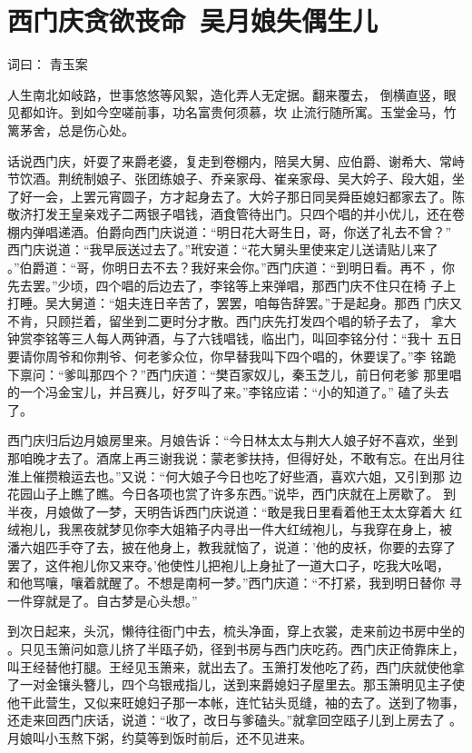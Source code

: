 \chapter{西门庆贪欲丧命~吴月娘失偶生儿}

词曰：
青玉案

人生南北如岐路，世事悠悠等风絮，造化弄人无定据。翻来覆去，
倒横直竖，眼见都如许。到如今空嗟前事，功名富贵何须慕，坎
止流行随所寓。玉堂金马，竹篱茅舍，总是伤心处。

话说西门庆，奸耍了来爵老婆，复走到卷棚内，陪吴大舅、应伯爵、谢希大、常峙
节饮酒。荆统制娘子、张团练娘子、乔亲家母、崔亲家母、吴大妗子、段大姐，坐
了好一会，上罢元宵圆子，方才起身去了。大妗子那日同吴舜臣媳妇都家去了。陈
敬济打发王皇亲戏子二两银子唱钱，酒食管待出门。只四个唱的并小优儿，还在卷
棚内弹唱递酒。伯爵向西门庆说道：“明日花大哥生日，哥，你送了礼去不曾？”
西门庆说道：“我早辰送过去了。”玳安道：“花大舅头里使来定儿送请贴儿来了
。”伯爵道：“哥，你明日去不去？我好来会你。”西门庆道：“到明日看。再不
，你先去罢。”少顷，四个唱的后边去了，李铭等上来弹唱，那西门庆不住只在椅
子上打睡。吴大舅道：“姐夫连日辛苦了，罢罢，咱每告辞罢。”于是起身。那西
门庆又不肯，只顾拦着，留坐到二更时分才散。西门庆先打发四个唱的轿子去了，
拿大钟赏李铭等三人每人两钟酒，与了六钱唱钱，临出门，叫回李铭分付：“我十
五日要请你周爷和你荆爷、何老爹众位，你早替我叫下四个唱的，休要误了。”李
铭跪下禀问：“爹叫那四个？”西门庆道：“樊百家奴儿，秦玉芝儿，前日何老爹
那里唱的一个冯金宝儿，并吕赛儿，好歹叫了来。”李铭应诺：“小的知道了。”
磕了头去了。

西门庆归后边月娘房里来。月娘告诉：“今日林太太与荆大人娘子好不喜欢，坐到
那咱晚才去了。酒席上再三谢我说：蒙老爹扶持，但得好处，不敢有忘。在出月往
淮上催攒粮运去也。”又说：“何大娘子今日也吃了好些酒，喜欢六姐，又引到那
边花园山子上瞧了瞧。今日各项也赏了许多东西。”说毕，西门庆就在上房歇了。
到半夜，月娘做了一梦，天明告诉西门庆说道：“敢是我日里看着他王太太穿着大
红绒袍儿，我黑夜就梦见你李大姐箱子内寻出一件大红绒袍儿，与我穿在身上，被
潘六姐匹手夺了去，披在他身上，教我就恼了，说道：'他的皮袄，你要的去穿了
罢了，这件袍儿你又来夺。'他使性儿把袍儿上身扯了一道大口子，吃我大吆喝，
和他骂嚷，嚷着就醒了。不想是南柯一梦。”西门庆道：“不打紧，我到明日替你
寻一件穿就是了。自古梦是心头想。”

到次日起来，头沉，懒待往衙门中去，梳头净面，穿上衣裳，走来前边书房中坐的
。只见玉箫问如意儿挤了半瓯子奶，径到书房与西门庆吃药。西门庆正倚靠床上，
叫王经替他打腿。王经见玉箫来，就出去了。玉箫打发他吃了药，西门庆就使他拿
了一对金镶头簪儿，四个乌银戒指儿，送到来爵媳妇子屋里去。那玉箫明见主子使
他干此营生，又似来旺媳妇子那一本帐，连忙钻头觅缝，袖的去了。送到了物事，
还走来回西门庆话，说道：“收了，改日与爹磕头。”就拿回空瓯子儿到上房去了
。月娘叫小玉熬下粥，约莫等到饭时前后，还不见进来。

